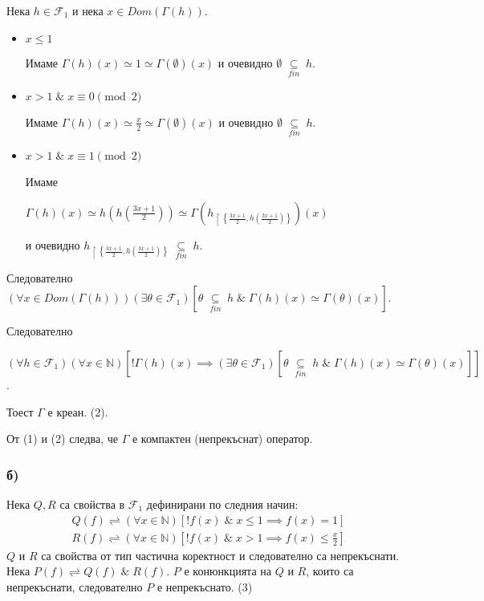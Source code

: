 \documentclass{article}
\begin{document}
Нека \(h \in \mathcal{F}_1\) и нека \(x \in Dom(\Gamma(h))\).
\begin{itemize}
\item \(x \leq 1\)

Имаме \(\Gamma(h)(x) \simeq 1 \simeq \Gamma(\emptyset)(x)\) и очевидно \(\emptyset \; \underset{fin}{\subseteq} \;  h\). 
\item \(x > 1 \; \& \; x \equiv 0 \pmod{2}\)

Имаме \(\Gamma(h)(x) \simeq \displaystyle\frac{x}{2} \simeq \Gamma(\emptyset)(x)\) и очевидно \(\emptyset \; \underset{fin}{\subseteq} \;  h\). 
\item \(x > 1 \; \& \; x \equiv 1 \pmod{2}\)

Имаме

\(\Gamma(h)(x) \simeq \displaystyle{h\left(h\left(\frac{3x + 1}{2}\right)\right)} \simeq \Gamma\left(h_{\displaystyle{\restriction{\left\{\displaystyle\frac{3x + 1}{2}, h\left(\displaystyle\frac{3x + 1}{2}\right)\right\}}}}\right)(x)\)

и очевидно \(h_{\displaystyle{\restriction{\left\{\displaystyle\frac{3x + 1}{2}, h\left(\displaystyle\frac{3x + 1}{2}\right)\right\}}}} \; \underset{fin}{\subseteq} \;  h\). 
\end{itemize}
Следователно \((\forall x \in Dom(\Gamma(h)))(\exists \theta \in \mathcal{F}_1)[\theta \; \underset{fin}{\subseteq} \;  h \; \& \; \Gamma(h)(x) \simeq \Gamma(\theta)(x)]\).

Следователно

\((\forall h \in \mathcal{F}_1)(\forall x \in \mathbb{N})[!\Gamma(h)(x) \implies (\exists \theta \in \mathcal{F}_1)[\theta \; \underset{fin}{\subseteq} \;  h \; \& \; \Gamma(h)(x) \simeq \Gamma(\theta)(x)]]\).

Тоест \(\Gamma\) е креан. (2).

От (1) и (2) следва, че \(\Gamma\) е компактен (непрекъснат) оператор.

\subsubsection*{б)}
Нека \(Q, R\) са свойства в \(\mathcal{F}_1\)
дефинирани по следния начин:
\begin{align*}
Q(f) \rightleftharpoons (\forall x \in \mathbb{N})[!f(x) \; \& \; x \leq 1 \implies f(x) = 1]\\
R(f) \rightleftharpoons (\forall x \in \mathbb{N})\left[!f(x) \; \& \; x > 1 \implies f(x) \leq \displaystyle\frac{x}{2}\right]
\end{align*}
\(Q\) и \(R\) са свойства от тип частична коректност и следователно са непрекъснати.
Нека \(P(f) \rightleftharpoons Q(f) \; \& \; R(f)\).
\(P\) е конюнкцията на \(Q\) и \(R\), които са непрекъснати, следователно \(P\) е непрекъснато. (3)
\end{document}
